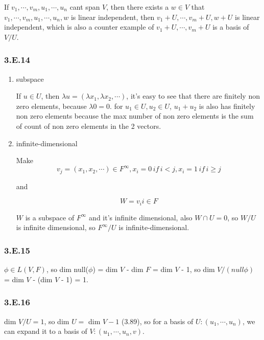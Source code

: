 If $v_{1},\cdots,v_{m}, u_{1},\cdots,u_{n}$ cant span $V$, then there exists a $w\in V$ that $v_{1},\cdots,v_{m}, u_{1},\cdots,u_{n}, w$ is linear independent, then $v_{1}+U,\cdots, v_{m}+U, w+U$ is linear independent, which is also a counter example of $v_{1}+U,\cdots, v_{m}+U$ is a basis of $V/U$.

\subsubsection*{3.E.14}

\begin{enumerate}
    \item subspace
    
    If $u\in U$, then $\lambda u = {(\lambda x_{1}, \lambda x_{2},\cdots )}$, it's easy to see that there are finitely non zero elements, because $\lambda 0 = 0$. for $u_{1}\in U, u_{2} \in U$, $u_{1} + u_{2}$ is also has finitely non zero elements because the max number of non zero elements is the sum of count of non zero elements in the 2 vectors.

    \item infinite-dimensional
    
    Make 
    \[v_{j} = (x_{1},x_{2},\cdots) \in F^{\infty}, x_{i} = 0\, if\, i < j, x_{i} = 1\, if\, i \geq j\]
    
    and
    
    \[W = {v_{i} i\in F}\]
    
    $W$ is a subspace of $F^{\infty}$ and it's infinite dimensional, also $W\cap U = {0}$, so $W/U$ is infinite dimensional, so $F^{\infty}/U$ is infinite-dimensional.
\end{enumerate}

\subsubsection*{3.E.15}

$\phi \in L(V, F)$, so dim null($\phi$) = dim $V$ - dim $F$ = dim $V$ - 1, so dim $V/(null \phi)$ = dim $V$ - (dim $V$ - 1) = 1.

\subsubsection*{3.E.16}

dim $V/U = 1$, so dim $U = $ dim $V - 1$ (3.89), so for a basis of $U: (u_{1}, \cdots, u_{n})$, we can expand it to a basis of $V: (u_{1}, \cdots, u_{n}, v)$. 

